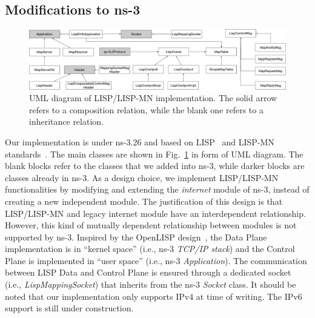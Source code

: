 \subsection{Modifications to ns-3}
\label{subsec:modifyns-3}
\begin{figure}[!t] \centering
\includegraphics[width=\textwidth]{Pics/LISP-NS3-UML} \caption{UML diagram of
LISP/LISP-MN implementation. The solid arrow refers to a composition relation,
while the blank one refers to a inheritance relation.}
	\label{LISP-UML}
\end{figure}
Our implementation  is under ns-3.26 and based on LISP~\cite{ietf-lisp-rfc6830bis-03} and
LISP-MN standards~\cite{meyer-lisp-mn-16}. The main classes are shown in
Fig.~\ref{LISP-UML} in form of UML diagram. The blank blocks refer to the
classes that we added into ns-3, while darker blocks are classes already in
ns-3. As a design choice, we implement LISP/LISP-MN functionalities by modifying
and extending the \emph{internet} module of ns-3, instead of creating a new
independent module. The justification of this design is that LISP/LISP-MN and
legacy internet module have an interdependent relationship. However, this kind
of mutually dependent relationship between modules is not supported by ns-3.
Inspired by the OpenLISP design~\cite{saucez2009openlisp}, the Data Plane
implementation is in ``kernel space'' (i.e., ns-3 \emph{TCP/IP stack}) and the
Control Plane is implemented in ``user space'' (i.e., ns-3 \emph{Application}). 
The communication between LISP Data and Control Plane is ensured through a
dedicated socket (i.e., \emph{LispMappingSocket}) that inherits from the ns-3
\emph{Socket} class. It should be noted that our implementation only supports
IPv4 at time of  writing. The IPv6 support 
is still under construction.


